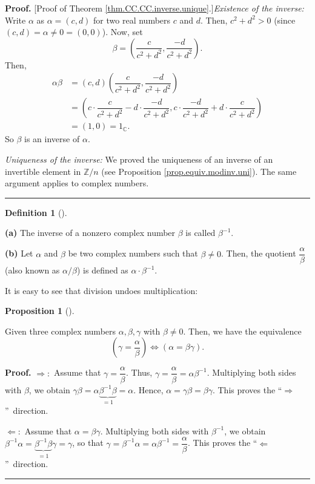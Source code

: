 \documentclass[numbers=enddot,12pt,final,onecolumn,notitlepage]{scrartcl}%
\numberwithin{exer}{subsection}
\theoremstyle{definition}
\newtheorem{prop}[theo]{Proposition}
\newenvironment{proposition}[1][]
{\begin{prop}[#1]\begin{leftbar}}
{\end{leftbar}\end{prop}}
\newtheorem{defi}[theo]{Definition}
\newenvironment{definition}[1][]
{\begin{defi}[#1]\begin{leftbar}}
{\end{leftbar}\end{defi}}
\newenvironment{proof}[1][Proof]{\noindent\textbf{#1.} }{\ \rule{0.5em}{0.5em}}
\begin{document}
\begin{proof}
[Proof of Theorem \ref{thm.CC.CC.inverse.unique}.]\textit{Existence of the
inverse:} Write $\alpha$ as $\alpha=\left(  c,d\right)  $ for two real numbers
$c$ and $d$. Then, $c^{2}+d^{2}>0$ (since $\left(  c,d\right)  =\alpha
\neq0=\left(  0,0\right)  $). Now, set%
\[
\beta=\left(  \dfrac{c}{c^{2}+d^{2}},\dfrac{-d}{c^{2}+d^{2}}\right)  .
\]
Then,%
\begin{align*}
\alpha\beta &  =\left(  c,d\right)  \left(  \dfrac{c}{c^{2}+d^{2}},\dfrac
{-d}{c^{2}+d^{2}}\right) \\
&  =\left(  c\cdot\dfrac{c}{c^{2}+d^{2}}-d\cdot\dfrac{-d}{c^{2}+d^{2}}%
,c\cdot\dfrac{-d}{c^{2}+d^{2}}+d\cdot\dfrac{c}{c^{2}+d^{2}}\right) \\
&  =\left(  1,0\right)  =1_{\mathbb{C}}.
\end{align*}
So $\beta$ is an inverse of $\alpha$.

\textit{Uniqueness of the inverse:} We proved the uniqueness of an inverse of
an invertible element in $\mathbb{Z}/n$ (see Proposition
\ref{prop.equiv.modinv.uni}). The same argument applies to complex numbers.
\end{proof}

\begin{definition}
\label{def.CC.CC.inverse.notations}\textbf{(a)} The inverse of a nonzero
complex number $\beta$ is called $\beta^{-1}$.

\textbf{(b)} Let $\alpha$ and $\beta$ be two complex numbers such that
$\beta\neq0$. Then, the quotient $\dfrac{\alpha}{\beta}$ (also known as
$\alpha/\beta$) is defined as $\alpha\cdot\beta^{-1}$.
\end{definition}

It is easy to see that division undoes multiplication:

\begin{proposition}
\label{prop.CC.CC.inverse.undo}Given three complex numbers $\alpha
,\beta,\gamma$ with $\beta\neq0$. Then, we have the equivalence%
\[
\left(  \gamma=\dfrac{\alpha}{\beta}\right)  \Longleftrightarrow\left(
\alpha=\beta\gamma\right)  .
\]

\end{proposition}

\begin{proof}
$\Longrightarrow:$ Assume that $\gamma=\dfrac{\alpha}{\beta}$. Thus,
$\gamma=\dfrac{\alpha}{\beta}=\alpha\beta^{-1}$. Multiplying both sides with
$\beta$, we obtain $\gamma\beta=\alpha\underbrace{\beta^{-1}\beta}_{=1}%
=\alpha$. Hence, $\alpha=\gamma\beta=\beta\gamma$. This proves the
\textquotedblleft$\Longrightarrow$\textquotedblright\ direction.

$\Longleftarrow:$ Assume that $\alpha=\beta\gamma$. Multiplying both sides
with $\beta^{-1}$, we obtain $\beta^{-1}\alpha=\underbrace{\beta^{-1}\beta
}_{=1}\gamma=\gamma$, so that $\gamma=\beta^{-1}\alpha=\alpha\beta^{-1}%
=\dfrac{\alpha}{\beta}$. This proves the \textquotedblleft$\Longleftarrow
$\textquotedblright\ direction.
\end{proof}
\end{document}
